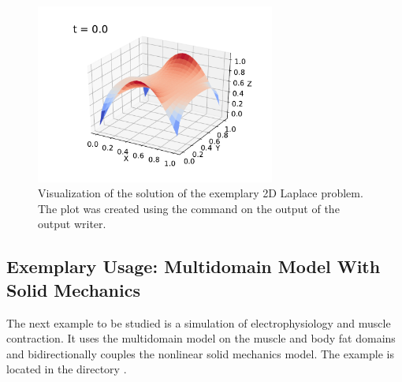 \begin{figure}[H]
  \centering%
  \includegraphics[width=0.7\textwidth]{images/implementation/laplace_plot.pdf}%
  \caption{Visualization of the solution of the exemplary 2D Laplace problem. The plot was created using the  command on the output of the  output writer.}%
  \label{fig:laplace_example_plot}%
\end{figure}

\subsection{Exemplary Usage: Multidomain Model With Solid Mechanics}\label{sec:exemplary_usage_2}

The next example to be studied is a simulation of electrophysiology and muscle contraction. It uses the multidomain model on the muscle and body fat domains and bidirectionally couples the nonlinear solid mechanics model. The example is located in the directory .

